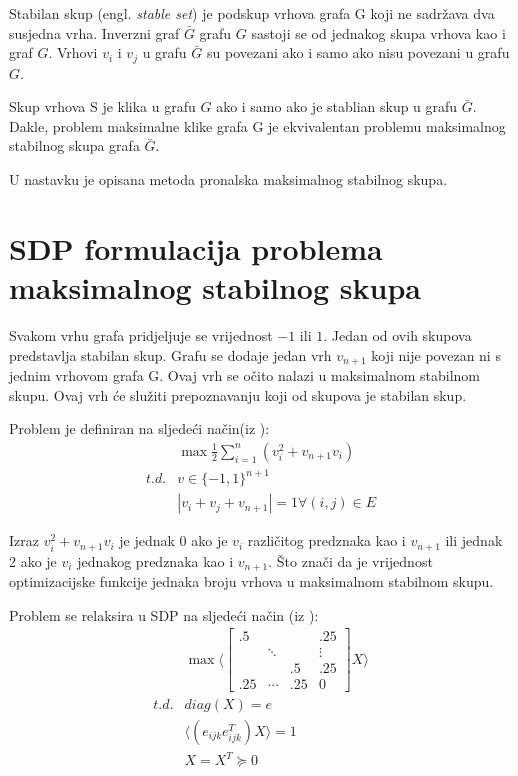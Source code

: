 \documentclass[diplomskirad]{fer}
\begin{document}
Stabilan skup (engl. \textit{stable set}) je podskup vrhova grafa G koji ne sadržava dva susjedna vrha. Inverzni graf $\bar{G}$ grafu $G$ 
sastoji se od jednakog skupa vrhova kao i graf $G$. Vrhovi $v_i$ i $v_j$ u grafu $\bar{G}$ su povezani ako i samo ako nisu povezani u grafu $G$.

Skup vrhova S je klika u grafu $G$ ako i samo ako je stablian skup u grafu $\bar{G}$. Dakle, problem maksimalne klike grafa G je ekvivalentan
problemu maksimalnog stabilnog skupa grafa $\bar{G}$. \cite{article}

U nastavku je opisana metoda pronalska maksimalnog stabilnog skupa.

\section{SDP formulacija problema maksimalnog stabilnog skupa}
Svakom vrhu grafa pridjeljuje se vrijednost $-1$ ili $1$. Jedan od ovih skupova predstavlja stabilan skup. Grafu se dodaje jedan vrh $v_{n+1}$ koji
nije povezan ni s jednim vrhovom grafa G. Ovaj vrh se očito nalazi u maksimalnom stabilnom skupu. Ovaj vrh će služiti prepoznavanju koji od skupova
je stabilan skup.

Problem je definiran na sljedeći način(iz \cite{article}):
\begin{equation}
  \begin{split}
    & \max \frac{1}{2} \sum_{i=1}^{n} (v_i^2+v_{n+1}v_{i}) \\
    t.d. & v \in \{-1, 1\}^{n+1} \\
         & |v_i+v_j+v_{n+1}| = 1 \forall (i, j) \in E
  \end{split}   
\end{equation}

Izraz $v_i^2+v_{n+1}v_{i}$ je jednak 0 ako je $v_i$ različitog predznaka kao i $v_{n+1}$ ili jednak 2 ako je $v_i$ jednakog predznaka kao i $v_{n+1}$.
Što znači da je vrijednost optimizacijske funkcije jednaka broju vrhova u maksimalnom stabilnom skupu.

Problem se relaksira u SDP na sljedeći način (iz \cite{article}):
\begin{equation} \label{eq1}
  \begin{split}
    & \max \Biggl \langle \begin{bmatrix}
      .5 & & & .25 \\
      & \ddots &  & \vdots \\
      & & .5 & .25 \\
      .25 & \cdots & .25 & 0
    \end{bmatrix} X \Biggr \rangle \\
    t.d. & diag(X) = e \\
    &  \langle (e_{ijk} e_{ijk}^T) X \rangle = 1 \\
    & X = X^T \succeq 0 
  \end{split}
\end{equation}
\end{document}
